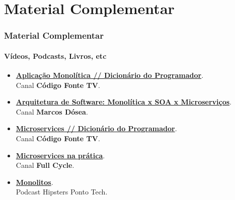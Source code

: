 \documentclass[
	10pt, %
	t, %
]{beamer}
\newcommand{\iconLink}[2]{\href{#1}{\faLink \hspace{0.2em} {#2}}}
\begin{document}
		
		
		


\section{Material Complementar}

\begin{frame}
	\frametitle{Material Complementar}
	\framesubtitle{Vídeos, Podcasts, Livros, etc}
	
	\begin{itemize}
		\item \href{https://youtu.be/CsrHHHPHKwE}{\textbf{Aplicação Monolítica // Dicionário do Programador}}.\\Canal \textbf{Código Fonte TV}.
		\item \href{https://youtu.be/suZfVAk7hco}{\textbf{Arquitetura de Software: Monolítica x SOA x Microserviços}}.\\Canal \textbf{Marcos Dósea}.
		\item \href{https://www.youtube.com/watch?v=_2bDOCTnbKc}{\textbf{Microservices // Dicionário do Programador}}.\\Canal \textbf{Código Fonte TV}.
		\item \href{https://youtu.be/gtv9szE_P1U}{\textbf{Microservices na prática}}.\\Canal \textbf{Full Cycle}.
		\item \href{https://www.hipsters.tech/uma-linguagem-para-cada-combate-hipsters-ponto-tech-277}{\textbf{Monolitos}}.\\Podcast Hipsters Ponto Tech.
	\end{itemize}
	
\end{frame}
\end{document}
